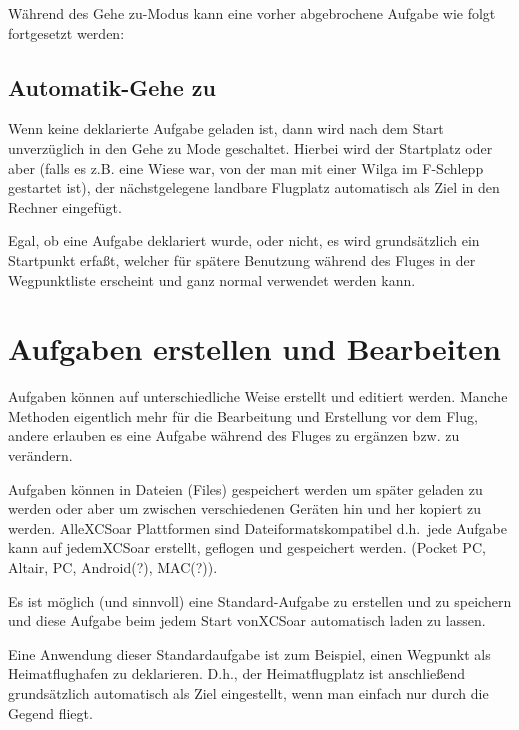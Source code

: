 Während des Gehe zu-Modus kann eine vorher abgebrochene Aufgabe wie folgt fortgesetzt werden:
\begin{quote}
\blink{}
\end{quote}
\subsection{Automatik-Gehe zu}

Wenn keine deklarierte Aufgabe geladen ist, dann wird nach dem Start unverzüglich in den Gehe zu Mode geschaltet. Hierbei wird der Startplatz oder aber (falls es z.B. eine Wiese war, von der man mit einer  Wilga im F-Schlepp gestartet ist), der nächstgelegene landbare Flugplatz automatisch als Ziel in den Rechner eingefügt.

Egal, ob eine Aufgabe deklariert wurde, oder nicht, es wird grundsätzlich ein Startpunkt erfaßt, welcher für spätere Benutzung während des Fluges in der Wegpunktliste erscheint und ganz normal  verwendet werden kann.  

\section{Aufgaben erstellen und Bearbeiten}

Aufgaben können auf unterschiedliche Weise erstellt und editiert  werden. Manche Methoden eigentlich mehr für die Bearbeitung und Erstellung vor dem Flug,  andere erlauben es eine Aufgabe während des Fluges zu ergänzen bzw. zu verändern.

Aufgaben können in Dateien (Files) gespeichert werden um später geladen zu werden oder aber um zwischen verschiedenen Geräten hin und her kopiert zu werden. Alle\textsf{XCSoar} Plattformen sind Dateiformatskompatibel d.h.\  jede Aufgabe kann auf jedem\textsf{XCSoar} erstellt, geflogen und gespeichert werden. (\textsf{Pocket PC, Altair, PC, Android(?), MAC(?)}).

\tip Es ist möglich (und sinnvoll) eine Standard-Aufgabe zu erstellen und zu speichern und diese  Aufgabe beim jedem Start von\textsf{XCSoar} automatisch laden zu lassen.

Eine Anwendung dieser Standardaufgabe ist zum Beispiel, einen Wegpunkt  als Heimatflughafen zu deklarieren. D.h.,  der Heimatflugplatz ist anschließend grundsätzlich automatisch als Ziel eingestellt, wenn man einfach nur durch die Gegend fliegt.

